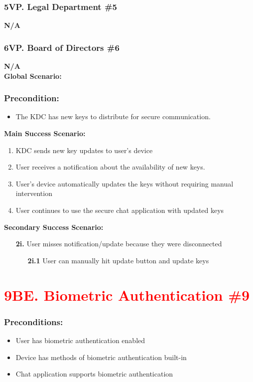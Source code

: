 \documentclass[]{article}
\begin{document}
\subsubsection*{5VP. Legal Department \#5}
\textbf{N/A}
\subsubsection*{6VP. Board of Directors \#6}
\textbf{N/A}\\

\noindent \textbf{Global Scenario:}
\subsubsection*{Precondition:}
\begin{itemize}
	\item The KDC has new keys to distribute for secure communication.
\end{itemize}
\textbf{Main Success Scenario:}
\begin{enumerate}
	\item KDC sends new key updates to user’s device
	\item User receives a notification about the availability of new keys.
	\item User's device automatically updates the keys without requiring manual intervention
	\item User continues to use the secure chat application with updated keys
\end{enumerate}
\textbf{Secondary Success Scenario:}
\begin{enumerate}
	\item[\textbf{2i.}] User misses notification/update because they were disconnected
		\begin{enumerate}
			\item[\textbf{2i.1}] User can manually hit update button and update keys
		\end{enumerate}
\end{enumerate}

\section*{\textcolor{red}{9BE. Biometric Authentication \#9}}
\subsubsection*{Preconditions:}
\begin{itemize}
	\item User has biometric authentication enabled
	\item Device has methods of biometric authentication built-in
	\item Chat application supports biometric authentication
\end{itemize}
\end{document}
